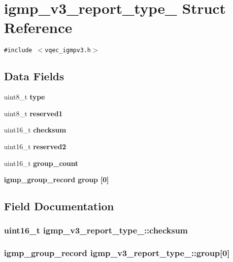 \section{igmp\_\-v3\_\-report\_\-type\_\- Struct Reference}
\label{structigmp__v3__report__type__}
{\tt \#include $<$vqec\_\-igmpv3.h$>$}

\subsection*{Data Fields}
\begin{CompactItemize}
\item 
uint8\_\-t \bf{type}
\item 
uint8\_\-t \bf{reserved1}
\item 
uint16\_\-t \bf{checksum}
\item 
uint16\_\-t \bf{reserved2}
\item 
uint16\_\-t \bf{group\_\-count}
\item 
\bf{igmp\_\-group\_\-record} \bf{group} [0]
\end{CompactItemize}


\subsection{Field Documentation}
\subsubsection{\setlength{\rightskip}{0pt plus 5cm}uint16\_\-t \bf{igmp\_\-v3\_\-report\_\-type\_\-::checksum}}\label{structigmp__v3__report__type___95f1165e9956e5b213caf18c389e7306}


\subsubsection{\setlength{\rightskip}{0pt plus 5cm}\bf{igmp\_\-group\_\-record} \bf{igmp\_\-v3\_\-report\_\-type\_\-::group}[0]}\label{structigmp__v3__report__type___2349a6cbaa5b34cd3c84ffaacb580932}


